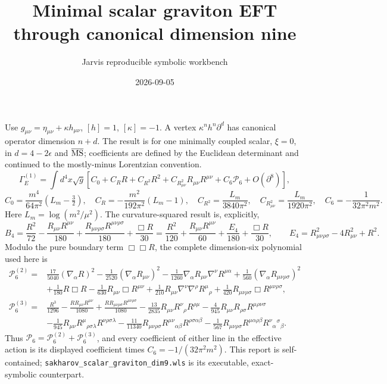 \documentclass[11pt]{article}
\title{Minimal scalar graviton EFT through canonical dimension nine}
\author{Jarvis reproducible symbolic workbench}
\date{2026-09-05}
\begin{document}
\maketitle
Use $g_{\mu\nu}=\eta_{\mu\nu}+\kappa h_{\mu\nu}$, $[h]=1$, $[\kappa]=-1$. A vertex $\kappa^nh^n\partial^d$ has canonical operator dimension $n+d$. The result is for one minimally coupled scalar, $\xi=0$, in $d=4-2\epsilon$ and $\overline{\rm MS}$; coefficients are defined by the Euclidean determinant and continued to the mostly-minus Lorentzian convention.
\[
\Gamma_E^{(1)}=\int d^4x\sqrt g\left[C_0+C_RR+C_{R^2}R^2+C_{R_{\mu\nu}^2}R_{\mu\nu}R^{\mu\nu}+C_6\mathcal P_6+O(\partial^8)\right],
\]
\[
C_0=\frac{m^4}{64\pi^2}(L_m-\tfrac32),\quad C_R=-\frac{m^2}{192\pi^2}(L_m-1),\quad C_{R^2}=\frac{L_m}{3840\pi^2},\quad C_{R_{\mu\nu}^2}=\frac{L_m}{1920\pi^2},\quad C_6=-\frac1{32\pi^2m^2}.
\]
Here $L_m=\log(m^2/\mu^2)$. The curvature-squared result is, explicitly,
\[
B_4=\frac{R^2}{72}-\frac{R_{\mu\nu}R^{\mu\nu}}{180}+\frac{R_{\mu\nu\rho\sigma}R^{\mu\nu\rho\sigma}}{180}+\frac{\Box R}{30}
=\frac{R^2}{120}+\frac{R_{\mu\nu}R^{\mu\nu}}{60}+\frac{E_4}{180}+\frac{\Box R}{30},
\qquad E_4=R_{\mu\nu\rho\sigma}^2-4R_{\mu\nu}^2+R^2.
\]
Modulo the pure boundary term $\Box\Box R$, the complete dimension-six polynomial used here is
\begin{align*}
\mathcal P_6^{(2)}={}&\frac{17}{5040}(\nabla_\alpha R)^2
-\frac{1}{2520}(\nabla_\alpha R_{\mu\nu})^2
-\frac{1}{1260}\nabla_\alpha R_{\mu\nu}\nabla^\nu R^{\mu\alpha}
+\frac{1}{560}(\nabla_\alpha R_{\mu\nu\rho\sigma})^2\\
&+\frac{1}{180}R\Box R
-\frac{1}{630}R_{\mu\nu}\Box R^{\mu\nu}
+\frac{1}{210}R_{\mu\nu}\nabla^\nu\nabla^\rho R^{\mu}{}_{\rho}
+\frac{1}{420}R_{\mu\nu\rho\sigma}\Box R^{\mu\nu\rho\sigma},\\
\mathcal P_6^{(3)}={}&\frac{R^3}{1296}
-\frac{R R_{\mu\nu}R^{\mu\nu}}{1080}
+\frac{R R_{\mu\nu\rho\sigma}R^{\mu\nu\rho\sigma}}{1080}
-\frac{13}{2835}R_{\mu\nu}R^{\nu}{}_{\rho}R^{\rho\mu}
-\frac{4}{945}R_{\mu\nu}R_{\rho\sigma}R^{\mu\rho\nu\sigma}\\
&-\frac{1}{945}R_{\mu\nu}R^{\mu}{}_{\rho\sigma\lambda}R^{\nu\rho\sigma\lambda}
-\frac{11}{11340}R_{\mu\nu\rho\sigma}R^{\mu\nu}{}_{\alpha\beta}R^{\rho\sigma\alpha\beta}
-\frac{1}{567}R_{\mu\nu\rho\sigma}R^{\mu\alpha\rho\beta}R^{\nu}{}_{\alpha}{}^{\sigma}{}_{\beta}.
\end{align*}
Thus $\mathcal P_6=\mathcal P_6^{(2)}+\mathcal P_6^{(3)}$, and every coefficient of either line in the effective action is its displayed coefficient times $C_6=-1/(32\pi^2m^2)$. This report is self-contained; \texttt{sakharov\_scalar\_graviton\_dim9.wls} is its executable, exact-symbolic counterpart.
\end{document}
